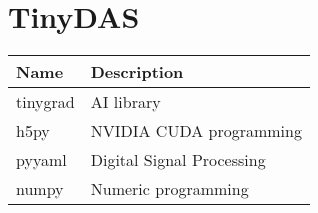 \section{TinyDAS}
\label{app:tinypacks}

\begin{table}[h]
\centering
\begin{tabular}{|l|l|}
\hline
\textbf{Name}  & \textbf{Description}                             \\ \hline
tinygrad          & AI library                                       \\ \hline
h5py           & NVIDIA CUDA programming                          \\ \hline
pyyaml            & Digital Signal Processing                        \\ \hline
numpy          & Numeric programming \\ \hline
\end{tabular}
\end{table}